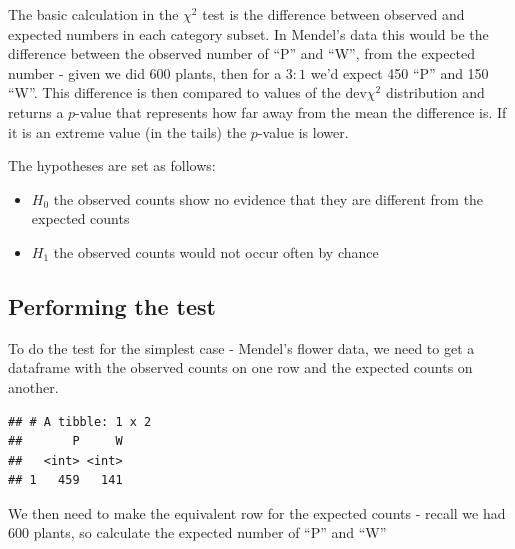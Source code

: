 \documentclass[
]{book}
\newenvironment{Shaded}{\begin{snugshade}}{\end{snugshade}}
\newcommand{\DataTypeTok}[1]{\textcolor[rgb]{0.13,0.29,0.53}{#1}}
\newcommand{\KeywordTok}[1]{\textcolor[rgb]{0.13,0.29,0.53}{\textbf{#1}}}
\newcommand{\NormalTok}[1]{#1}
\newcommand{\OperatorTok}[1]{\textcolor[rgb]{0.81,0.36,0.00}{\textbf{#1}}}
\newcommand{\StringTok}[1]{\textcolor[rgb]{0.31,0.60,0.02}{#1}}
\providecommand{\tightlist}{%
  \setlength{\itemsep}{0pt}\setlength{\parskip}{0pt}}
\begin{document}
The basic calculation in the \(\chi^2\) test is the difference between observed and expected numbers in each category subset. In Mendel's data this would be the difference between the observed number of ``P'' and ``W'', from the expected number - given we did 600 plants, then for a \(3:1\) we'd expect 450 ``P'' and 150 ``W''. This difference is then compared to values of the dev\(\chi^2\) distribution and returns a \(p\)-value that represents how far away from the mean the difference is. If it is an extreme value (in the tails) the \(p\)-value is lower.

The hypotheses are set as follows:

\begin{itemize}
\tightlist
\item
  \(H_{0}\) the observed counts show no evidence that they are different from the expected counts
\item
  \(H_{1}\) the observed counts would not occur often by chance
\end{itemize}

\hypertarget{performing-the-test}{%
\subsection{Performing the test}\label{performing-the-test}}

To do the test for the simplest case - Mendel's flower data, we need to get a dataframe with the observed counts on one row and the expected counts on another.

\begin{Shaded}
\end{Shaded}

\begin{verbatim}
## # A tibble: 1 x 2
##       P     W
##   <int> <int>
## 1   459   141
\end{verbatim}

We then need to make the equivalent row for the expected counts - recall we had 600 plants, so calculate the expected number of ``P'' and ``W''
\end{document}
